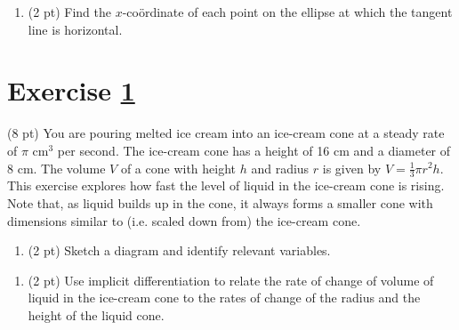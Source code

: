 \spaceSolution{2.5in}{%
}%



\begin{enumerate}[resume,label=(\alph*)]
\item\label{itm : P1Q4e} (2 pt) Find the $x$-co\"{o}rdinate of each point on the ellipse at which the tangent line is horizontal.
\end{enumerate}

\spaceSolution{2.5in}{%
}%





%
%
%
%


\newpage

\section{Exercise \ref{sec : Math112 Spring2022 FinalExam P1Q5}}
\label{sec : Math112 Spring2022 FinalExam P1Q5}

(8 pt) You are pouring melted ice cream into an ice-cream cone at a steady rate of $\pi \text{ cm}^{3}$ per second. The ice-cream cone has a height of 16 cm and a diameter of 8 cm. The volume $V$ of a cone with height $h$ and radius $r$ is given by $V = \frac{1}{3} \pi r^{2} h$. This exercise explores how fast the level of liquid in the ice-cream cone is rising. Note that, as liquid builds up in the cone, it always forms a smaller cone with dimensions similar to (i.e. scaled down from) the ice-cream cone.

\begin{enumerate}[label=(\alph*)]
\item\label{itm : P1Q4a} (2 pt) Sketch a diagram and identify relevant variables.
\end{enumerate}

\spaceSolution{1.5in}{%
}%



\begin{enumerate}[resume,label=(\alph*)]
\item\label{itm : P1Q4b} (2 pt) Use implicit differentiation to relate the rate of change of volume of liquid in the ice-cream cone to the rates of change of the radius and the height of the liquid cone.
\end{enumerate}

\spaceSolution{1in}{%
}%



